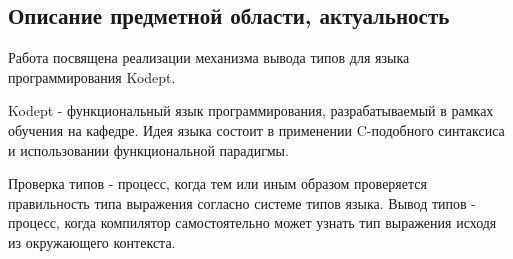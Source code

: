 ﻿%
\subsection{Описание предметной области, актуальность}
\begin{frame}%

    Работа посвящена реализации механизма вывода типов для языка программирования Kodept.

    \vspace{1cm}

    Kodept - функциональный язык программирования, разрабатываемый в рамках обучения на кафедре.
    Идея языка состоит в применении C-подобного синтаксиса и использовании функциональной парадигмы.

    \vspace{1cm}

    Проверка типов - процесс, когда тем или иным образом проверяется правильность типа выражения согласно системе типов языка.
    Вывод типов - процесс, когда компилятор самостоятельно может узнать тип выражения исходя из окружающего контекста.

\end{frame}
